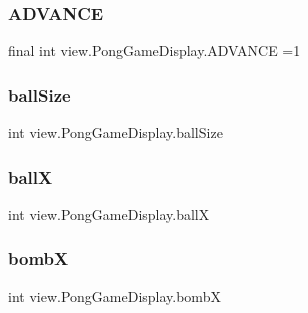 \subsubsection{\texorpdfstring{A\+D\+V\+A\+N\+CE}{ADVANCE}}
{\footnotesize\ttfamily final int view.\+Pong\+Game\+Display.\+A\+D\+V\+A\+N\+CE =1\hspace{0.3cm}{\ttfamily [private]}}

\hypertarget{classview_1_1_pong_game_display_ae26155e2cdf4f47b164377b7ee3ba3e4}{}\label{classview_1_1_pong_game_display_ae26155e2cdf4f47b164377b7ee3ba3e4} 
\subsubsection{\texorpdfstring{ball\+Size}{ballSize}}
{\footnotesize\ttfamily int view.\+Pong\+Game\+Display.\+ball\+Size\hspace{0.3cm}{\ttfamily [private]}}

\hypertarget{classview_1_1_pong_game_display_aa1f518edcfa598a7ba036567eadf3ae0}{}\label{classview_1_1_pong_game_display_aa1f518edcfa598a7ba036567eadf3ae0} 
\subsubsection{\texorpdfstring{ballX}{ballX}}
{\footnotesize\ttfamily int view.\+Pong\+Game\+Display.\+ballX\hspace{0.3cm}{\ttfamily [private]}}

\hypertarget{classview_1_1_pong_game_display_ac37e1767ccd91ae204de6b0afc5aefaa}{}\label{classview_1_1_pong_game_display_ac37e1767ccd91ae204de6b0afc5aefaa} 
\subsubsection{\texorpdfstring{bombX}{bombX}}
{\footnotesize\ttfamily int view.\+Pong\+Game\+Display.\+bombX\hspace{0.3cm}{\ttfamily [private]}}

\hypertarget{classview_1_1_pong_game_display_a195949e482e01530f0c8c876bbf88e6a}{}\label{classview_1_1_pong_game_display_a195949e482e01530f0c8c876bbf88e6a} 
